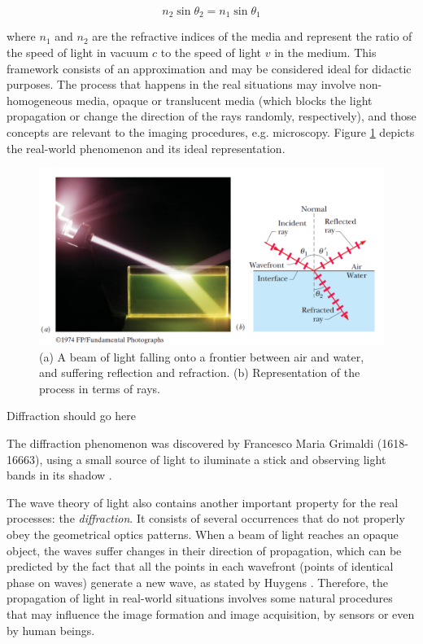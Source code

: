 \begin{equation}
    \label{eqn:snells_law}
       n_{2}\sin{\theta_{2}} = n_{1}\sin{\theta_{1}}
\end{equation}

\noindent where $\mathit{n_{1}}$ and $\mathit{n_{2}}$ are the refractive indices of the media and represent the ratio of the speed of light in vacuum $\mathit{c}$ to the speed of light $\mathit{v}$ in the medium. This framework consists of an approximation and may be considered ideal for didactic purposes. The process that happens in the real situations may involve non-homogeneous media, opaque or translucent media (which blocks the light propagation or change the direction of the rays randomly, respectively), and those concepts are relevant to the imaging procedures, e.g. microscopy. Figure \ref{fig:beam_split} depicts the real-world phenomenon and its ideal representation.

\begin{figure}[htb]
	\centering
	\caption{\label{fig:beam_split} 
	    (a) A beam of light falling onto a frontier between air and water, and suffering reflection and refraction. (b) Representation of the process in terms of rays.}
	\begin{center}
	    \includegraphics[scale=0.3]{images/fig3.png}
	\end{center}
	\centering
\end{figure}

{\color{red} Diffraction should go here}

The diffraction phenomenon was discovered by Francesco Maria Grimaldi (1618-16663), using a small source of light to iluminate a stick and observing light bands in its shadow \cite{zilio2009optica}.

The wave theory of light also contains another important property for the real processes: the \emph{diffraction}. It consists of several occurrences that do not properly obey the geometrical optics patterns. When a beam of light reaches an opaque object, the waves suffer changes in their direction of propagation, which can be predicted by the fact that all the points in each wavefront (points of identical phase on waves) generate a new wave, as stated by Huygens \cite{fowles1989introduction}. Therefore, the propagation of light in real-world situations involves some natural procedures that may influence the image formation and image acquisition, by sensors or even by human beings.

